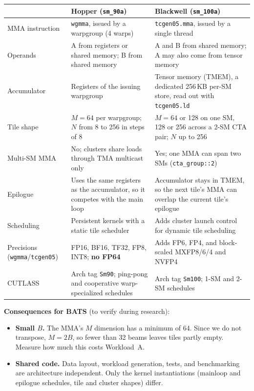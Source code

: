 \documentclass[10pt,letterpaper]{article}
\begin{document}
\begin{tabularx}{\linewidth}{@{}l X X@{}}
  \toprule
  & \textbf{Hopper (\texttt{sm\_90a})} & \textbf{Blackwell (\texttt{sm\_100a})} \\
  \midrule
  MMA instruction & \texttt{wgmma}, issued by a warpgroup (4 warps) & \texttt{tcgen05.mma}, issued by a single thread \\
  Operands & A from registers or shared memory; B from shared memory & A and B from shared memory; A may also come from tensor memory \\
  Accumulator & Registers of the issuing warpgroup & Tensor memory (TMEM), a dedicated 256\,KB per-SM store, read out with \texttt{tcgen05.ld} \\
  Tile shape & $M = 64$ per warpgroup; $N$ from 8 to 256 in steps of 8 & $M = 64$ or 128 on one SM, 128 or 256 across a 2-SM CTA pair; $N$ up to 256 \\
  Multi-SM MMA & No; clusters share loads through TMA multicast only & Yes; one MMA can span two SMs (\texttt{cta\_group::2}) \\
  Epilogue & Uses the same registers as the accumulator, so it competes with the main loop & Accumulator stays in TMEM, so the next tile's MMA can overlap the current tile's epilogue \\
  Scheduling & Persistent kernels with a static tile scheduler & Adds cluster launch control for dynamic tile scheduling \\
  Precisions (\texttt{wgmma}/\texttt{tcgen05}) & FP16, BF16, TF32, FP8, INT8; \textbf{no FP64} & Adds FP6, FP4, and block-scaled MXFP8/6/4 and NVFP4 \\
  CUTLASS & Arch tag \texttt{Sm90}; ping-pong and cooperative warp-specialized schedules & Arch tag \texttt{Sm100}; 1-SM and 2-SM schedules \\
  \bottomrule
\end{tabularx}

\textbf{Consequences for BATS} (to verify during research):
\begin{itemize}
  \item \textbf{Small $B$.} The MMA's $M$ dimension has a minimum of 64. Since we do not transpose, $M = 2B$, so fewer than 32 beams leaves tiles partly empty. Measure how much this costs Workload~A.
  \item \textbf{Shared code.} Data layout, workload generation, tests, and benchmarking are architecture independent. Only the kernel instantiations (mainloop and epilogue schedules, tile and cluster shapes) differ.
\end{itemize}
\end{document}
